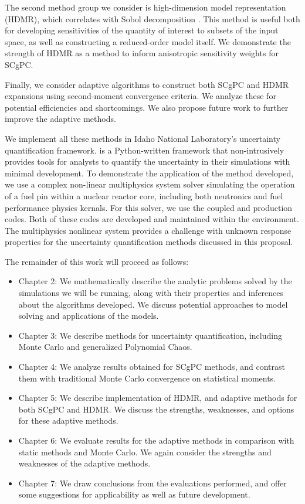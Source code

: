 The second method group we consider is high-dimension model representation (HDMR), which correlates with Sobol
decomposition \cite{hdmr}.  This method is useful both for developing sensitivities of the quantity of interest to subsets
of the input space, as well as constructing a reduced-order model itself.  We demonstrate the strength of HDMR
as a method to inform anisotropic sensitivity weights for SCgPC.

Finally, we consider adaptive algorithms to construct both SCgPC and HDMR expansions using second-moment
convergence criteria.  We analyze these for potential efficiencies and shortcomings.  We also propose future
work to further improve the adaptive methods.

We implement all these methods in Idaho National Laboratory's \raven{}\cite{raven}
uncertainty quantification framework. \raven{} is a Python-written framework that non-intrusively provides
tools for analysts to quantify the uncertainty in their simulations with minimal development.  To demonstrate
the application of the method developed, we use a complex non-linear multiphysics system solver simulating
the operation of a fuel pin within a nuclear reactor core, including both neutronics and fuel performance
physics kernals.  For this solver, we use the coupled \rattlesnake{}\cite{rattlesnake} and 
\bison{} \cite{bison,mammoth} production codes.
Both of these codes are developed and maintained within the \moose{}\cite{moose} environment.  The
multiphysics nonlinear system provides a challenge with unknown response properties for the uncertainty
quantification methods discussed in this proposal.

The remainder of this work will proceed as follows:
\begin{itemize}
  \item Chapter 2: We mathematically describe the analytic problems solved by the simulations we will be running,
    along with their properties and inferences about the algorithms developed.
    We discuss potential approaches to model solving and applications of the models.
  \item Chapter 3: We describe methods for uncertainty quantification, including Monte Carlo
    and generalized Polynomial Chaos.
  \item Chapter 4: We analyze results obtained for SCgPC methods, and contrast them with traditional
    Monte Carlo convergence on statistical moments.
  \item Chapter 5: We describe implementation of HDMR, and adaptive methods for both SCgPC and HDMR.  We discuss the
    strengths, weaknesses, and options for these adaptive methods.
  \item Chapter 6: We evaluate results for the adaptive methods in comparison with static methods and Monte
    Carlo.  We again consider the strengths and weaknesses of the adaptive methods. 
  \item Chapter 7: We draw conclusions from the evaluations performed, and offer some suggestions for
    applicability as well as future development.
\end{itemize}
